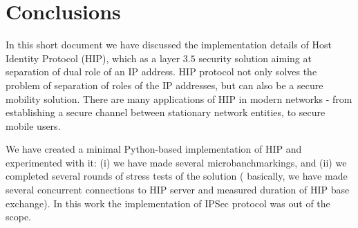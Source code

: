 \section{Conclusions}
\label{section:conclusion}

In this short document we have discussed the implementation 
details of Host Identity Protocol (HIP), which as a layer $3.5$ 
security solution aiming at separation of dual role of an IP
address. HIP protocol not only solves the problem of separation
of roles of the IP addresses, but can also be a secure mobility
solution. There are many applications of HIP in modern networks -
from establishing a secure channel between stationary network
entities, to secure mobile users.

We have created a minimal Python-based implementation of HIP and 
experimented with it: (i) we have made several microbanchmarkings, and (ii)
we completed several rounds of stress tests of the solution (
basically, we have made several concurrent connections to HIP
server and measured duration of HIP base exchange). In this work the 
implementation of IPSec protocol was out of the scope. 